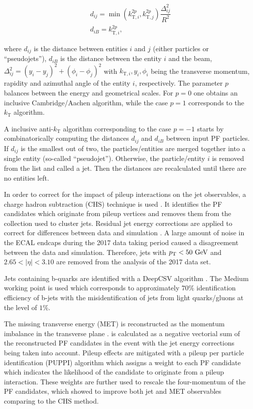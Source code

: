 \begin{align}
    &d_{ij} = \min(k_{\text{T},i}^{2p},k_{\text{T},j}^{2p})\dfrac{\Delta^2_{ij}}{R^2}\\
    &d_{iB} = k_{\text{T},i}^{2p},
\end{align}

where $d_{ij}$ is the distance between entities $i$ and $j$ (either particles or \enquote{pseudojets}), $d_{iB}$ is the distance between the entity $i$ and the beam,  $\Delta^2_{ij} = (y_i-y_j)^2 + (\phi_i - \phi_j)^2$ with $k_{\text{T},i}, y_i, \phi_i$ being the transverse momentum, rapidity and azimuthal angle of the entity $i$, respectively. The parameter $p$ balances between the energy and geometrical scales. For $p=0$ one obtains an inclusive Cambridge/Aachen algorithm, while the case $p=1$ corresponds to the $k_\text{T}$ algorithm.

A inclusive anti-$k_\text{T}$ algorithm corresponding to the case $p=-1$ starts by combinatorically computing the distances $d_{ij}$ and $d_{iB}$ between input PF particles. If $d_{ij}$ is the smallest out of two, the particles/entities are merged together into a single entity (so-called \enquote{pseudojet}). Otherwise, the particle/entity $i$ is removed from the list and called a jet. Then the distances are recalculated until there are no entities left.

In order to correct for the impact of pileup interactions on the jet observables, a charge hadron subtraction (CHS) technique is used \cite{CMS-PAS-JME-14-001}. It identifies the PF candidates which originate from pileup vertices and removes them from the collection used to cluster jets. Residual jet energy corrections are applied to correct for differences between data and simulation \cite{CMS:2016lmd}. A large amount of noise in the ECAL endcaps during the 2017 data taking period caused a disagreement between the data and simulation. Therefore, jets with $p_{\text{T}} < 50~\text{GeV}$ and $2.65 < |\eta| < 3.10$ are removed from the analysis of the 2017 data set. 

Jets containing b-quarks are identified with a DeepCSV algorithm \cite{CMS:2017wtu}. The Medium working point is used which corresponds to approximately $70\%$ identification efficiency of b-jets with the misidentification of jets from light quarks/gluons at the level of $1\%$.

The missing transverse energy (MET) \met is reconstructed as the momentum imbalance in the transverse plane \cite{CMS:2019ctu}. \met is calculated as a negative vectorial sum of the reconstructed PF candidates in the event with the jet energy corrections being taken into account. Pileup effects are mitigated with a pileup per particle identification (PUPPI) algorithm \cite{Bertolini:2014bba} which assigns a weight to each PF candidate which indicates the likelihood of the candidate to originate from a pileup interaction. These weights are further used to rescale the four-momentum of the PF candidates, which showed to improve both jet and MET observables comparing to the CHS method.

